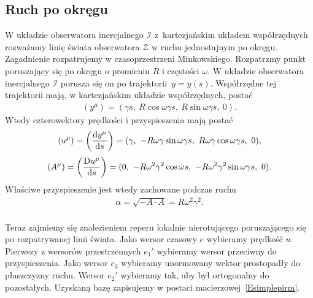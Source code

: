 \subsection{Ruch po okręgu}
W układzie obserwatora inercjalnego $\mathcal{I}$ z~kartezjańskim 
układem współrzędnych rozważamy linię świata 
obserwatora $\mathcal{Z}$ w ruchu jednostajnym po okręgu.
Zagadnienie rozpatrujemy w czasoprzestrzeni Minkowskiego.
Rozpatrzmy punkt poruszający się po okręgu o promieniu $R$ i 
częstości $\omega$. W układzie
obserwatora inercjalnego $\mathcal{I}$ porusza się on po 
trajektorii~$y=y(s)$. Współrzędne tej trajektorii mają, w kartezjańskim 
układzie współrzędnych, postać
\begin{align}
(y^\mu) = (\gamma s,\ R\cos\omega\gamma s,\ R\sin\omega\gamma s,\ 0).
\end{align}
Wtedy czterowektory prędkości i przyspieszenia mają postać
\begin{align}
(u^\mu) = \left( \frac{\text{d} y^\mu}{\text{d} s} \right) 
= (\gamma,\ -R\omega\gamma\sin\omega\gamma s,
\ R\omega\gamma\cos\omega\gamma s,\ 0),
\end{align}
\begin{align}
(A^\mu) = \left( \frac{\text{D} u^\mu}{\text{d} s}\right) 
= (0,\ -R\omega^2\gamma^2\cos\omega s
,\ -R\omega^2\gamma^2\sin\omega\gamma s,\ 0).
\end{align}
Właściwe przyspieszenie jest wtedy zachowane podczas ruchu
\begin{align}
\alpha =\sqrt{ - A\cdot A} =  R\omega^2\gamma^2 .
\end{align}
\\
%
Teraz zajmiemy się znalezieniem reperu lokalnie nierotującego
poruszającego się po rozpatrywanej linii świata.
Jako wersor czasowy $e$ wybieramy prędkość $u$. 
Pierwszy z wersorów przestrzennych $e_1'$ wybieramy 
wersor przeciwny do przyspieszenia.
Jako wersor $e_3$ wybieramy unormowany wektor 
prostopadły do płaszczyzny ruchu.
Wersor $e_2'$ wybieramy tak, aby był ortogonalny do pozostałych. 
Uzyskaną bazę zapisujemy w postaci macierzowej~\eqref{Esimplepirm}.
